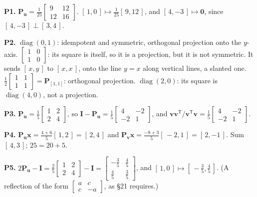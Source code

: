 \documentclass[11pt]{article}
\theoremstyle{plain}
\theoremstyle{definition}
\theoremstyle{remark}
\newcommand{\vc}[1]{\mathbf{#1}}
\newcommand{\mt}[1]{\mathbf{#1}}
\newcommand{\T}{^{\mathsf{T}}}
\DeclareMathOperator{\diagop}{diag}
\begin{document}
\noindent\textbf{P1.} $\mt{P}_{\vc{u}}=\frac{1}{25}\begin{bmatrix}9&12\\12&16\end{bmatrix}$.
$[\,1,0\,]\mapsto\frac{1}{25}[\,9,12\,]$, and $[\,4,-3\,]\mapsto\vc{0}$, since
$[\,4,-3\,]\perp[\,3,4\,]$.

\smallskip
\noindent\textbf{P2.} $\diagop(0,1)$: idempotent and symmetric, orthogonal
projection onto the $y$-axis. $\begin{bmatrix}1&0\\1&0\end{bmatrix}$: its square
is itself, so it is a projection, but it is not symmetric. It sends $[\,x,y\,]$
to $[\,x,x\,]$, onto the line $y=x$ along vertical lines, a slanted one.
$\frac12\begin{bmatrix}1&1\\1&1\end{bmatrix}=\mt{P}_{[1,1]}$: orthogonal
projection. $\diagop(2,0)$: its square is $\diagop(4,0)$, not a projection.

\smallskip
\noindent\textbf{P3.} $\mt{P}_{\vc{u}}=\frac15\begin{bmatrix}1&2\\2&4\end{bmatrix}$,
so $\mt{I}-\mt{P}_{\vc{u}}=\frac15\begin{bmatrix}4&-2\\-2&1\end{bmatrix}$, and
$\vc{v}\vc{v}\T/\vc{v}\T\vc{v}=\frac15\begin{bmatrix}4&-2\\-2&1\end{bmatrix}$.
\checkmark

\smallskip
\noindent\textbf{P4.} $\mt{P}_{\vc{u}}\vc{x}=\frac{4+6}{5}[\,1,2\,]=[\,2,4\,]$ and
$\mt{P}_{\vc{v}}\vc{x}=\frac{-8+3}{5}[\,-2,1\,]=[\,2,-1\,]$. Sum $[\,4,3\,]$;
$25=20+5$. \checkmark

\smallskip
\noindent\textbf{P5.} $2\mt{P}_{\vc{u}}-\mt{I}=\frac25\begin{bmatrix}1&2\\2&4\end{bmatrix}-\mt{I}
=\begin{bmatrix}-\frac35&\frac45\\[2pt]\frac45&\frac35\end{bmatrix}$, and
$[\,1,0\,]\mapsto[\,-\tfrac35,\tfrac45\,]$. (A reflection of the form
$\begin{bmatrix}a&c\\c&-a\end{bmatrix}$, as \S21 requires.)
\end{document}
